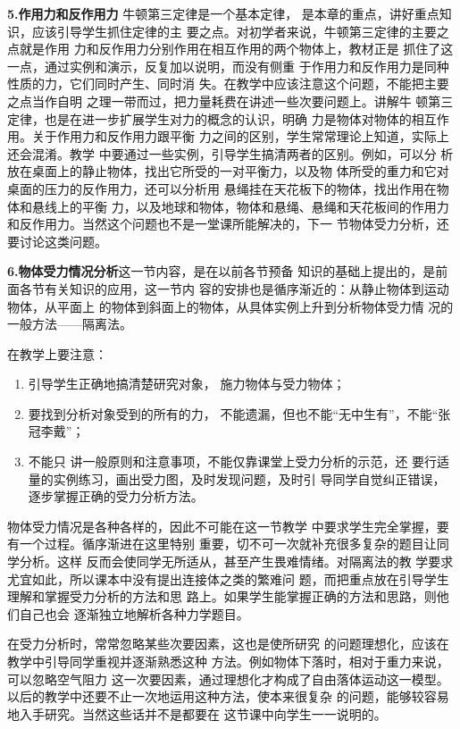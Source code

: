 \textbf{5.作用力和反作用力}\quad 
牛顿第三定律是一个基本定律，
是本章的重点，讲好重点知识，应该引导学生抓住定律的主
要之点。对初学者来说，牛顿第三定律的主要之点就是作用
力和反作用力分别作用在相互作用的两个物体上，教材正是
抓住了这一点，通过实例和演示，反复加以说明，而没有侧重
于作用力和反作用力是同种性质的力，它们同时产生、同时消
失。在教学中应该注意这个问题，不能把主要之点当作自明
之理一带而过，把力量耗费在讲述一些次要问题上。讲解牛
顿第三定律，也是在进一步扩展学生对力的概念的认识，明确
力是物体对物体的相互作用。关于作用力和反作用力跟平衡
力之间的区别，学生常常理论上知道，实际上还会混淆。教学
中要通过一些实例，引导学生搞清两者的区别。例如，可以分
析放在桌面上的静止物体，找出它所受的一对平衡力，以及物
体所受的重力和它对桌面的压力的反作用力，还可以分析用
悬绳挂在天花板下的物体，找出作用在物体和悬线上的平衡
力，以及地球和物体，物体和悬绳、悬绳和天花板间的作用力
和反作用力。当然这个问题也不是一堂课所能解决的，下一
节物体受力分析，还要讨论这类问题。

\textbf{6.物体受力情况分析}\quad  这一节内容，是在以前各节预备
知识的基础上提出的，是前面各节有关知识的应用，这一节内
容的安排也是循序渐近的：从静止物体到运动物体，从平面上
的物体到斜面上的物体，从具体实例上升到分析物体受力情
况的一般方法——隔离法。

在教学上要注意：
\begin{enumerate}
    \item 引导学生正确地搞清楚研究对象，
施力物体与受力物体；
\item 要找到分析对象受到的所有的力，
不能遗漏，但也不能“无中生有”，不能“张冠李戴”；
\item 不能只
讲一般原则和注意事项，不能仅靠课堂上受力分析的示范，还
要行适量的实例练习，画出受力图，及时发现问题，及时引
导同学自觉纠正错误，逐步掌握正确的受力分析方法。
\end{enumerate}

物体受力情况是各种各样的，因此不可能在这一节教学
中要求学生完全掌握，要有一个过程。循序渐进在这里特别
重要，切不可一次就补充很多复杂的题目让同学分析。这样
反而会使同学无所适从，甚至产生畏难情绪。对隔离法的教
学要求尤宜如此，所以课本中没有提出连接体之类的繁难问
题，而把重点放在引导学生理解和掌握受力分析的方法和思
路上。如果学生能掌握正确的方法和思路，则他们自己也会
逐渐独立地解析各种力学题目。

在受力分析时，常常忽略某些次要因素，这也是使所研究
的问题理想化，应该在教学中引导同学重视并逐渐熟悉这种
方法。例如物体下落时，相对于重力来说，可以忽略空气阻力
这一次要因素，通过理想化才构成了自由落体运动这一模型。
以后的教学中还要不止一次地运用这种方法，使本来很复杂
的问题，能够较容易地入手研究。当然这些话并不是都要在
这节课中向学生一一说明的。

